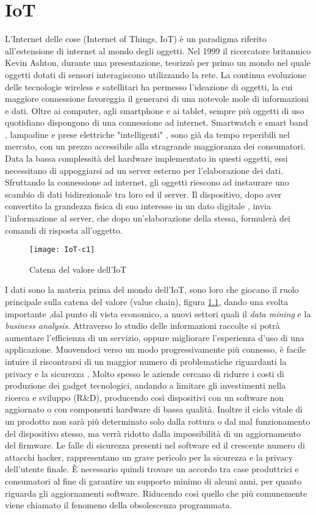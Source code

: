 \chapter{IoT}
L'Internet delle cose (Internet of Things, IoT) è un paradigma riferito
all’estensione di internet al mondo degli oggetti. Nel 1999 il ricercatore
britannico Kevin Ashton, durante una presentazione, teorizzò  per primo un mondo
nel quale oggetti dotati di sensori interagiscono utilizzando la rete.  La
continua evoluzione delle tecnologie wireless e satellitari ha permesso
l'ideazione di oggetti, la cui maggiore connessione favoreggia il generarsi
di una notevole mole di informazioni e dati.
Oltre ai computer, agli smartphone e ai tablet, sempre più
oggetti di uso quotidiano dispongono di una connessione ad internet. Smartwatch
e smart band , lampadine e prese elettriche "intelligenti" ,  sono già da tempo
reperibili nel mercato, con un prezzo accessibile alla stragrande maggioranza dei
consumatori.  Data la bassa
complessità del hardware implementato in questi oggetti, essi necessitano di
appoggiarsi ad un server esterno per l'elaborazione dei dati.  Sfruttando la
connessione ad internet, gli oggetti riescono ad instaurare uno scambio di dati
bidirezionale tra loro ed il server. Il dispositivo,  dopo aver
convertito la grandezza fisica di suo interesse in un dato digitale
, invia l'informazione al server, che  dopo un'elaborazione della
stessa, formulerà dei comandi di risposta all'oggetto.
\\
\begin{figure}[ht]
        \centering 
                \texttt{[image: IoT-c1]}
        \caption{Catena del valore dell'IoT}
        \label{fig:IoT_chain}
\end{figure}
I dati sono la materia prima del mondo dell'IoT, sono loro che giocano il ruolo
principale sulla catena del valore (value chain), figura \ref{fig:IoT_chain},
dando una svolta importante ,dal
punto di vista economico, a nuovi settori quali il \emph{data mining} e la
\emph{business analysis}.
Attraverso lo studio delle informazioni raccolte si potrà  aumentare l’efficienza di un
servizio, oppure  migliorare l'esperienza d'uso di una applicazione.
Muovendoci verso un modo progressivamente più connesso, è facile intuire il riscontrarsi
di un maggior numero di problematiche riguardanti la privacy e la sicurezza 
.  Molto spesso le aziende cercano di ridurre i costi di produzione dei gadget
tecnologici, andando a limitare gli investimenti nella ricerca e sviluppo
(R\&D), producendo così dispositivi con un software non aggiornato o con
componenti hardware di bassa qualità.
 Inoltre il ciclo vitale di un prodotto non sarà più determinato solo dalla
rottura o dal mal funzionamento del dispositivo stesso, ma verrà ridotto dalla
impossibilità di un aggiornamento del firmware.
Le falle di sicurezza presenti nel software  ed il crescente  numero di
attacchi hacker, rappresentano un grave pericolo per la sicurezza e la privacy
dell'utente finale.
È necessario quindi trovare un accordo tra case produttrici e
consumatori al fine di garantire un supporto minimo di alcuni anni, per quanto
riguarda gli aggiornamenti software. Riducendo così quello che più comunemente
viene chiamato il fenomeno della obsolescenza programmata. 
